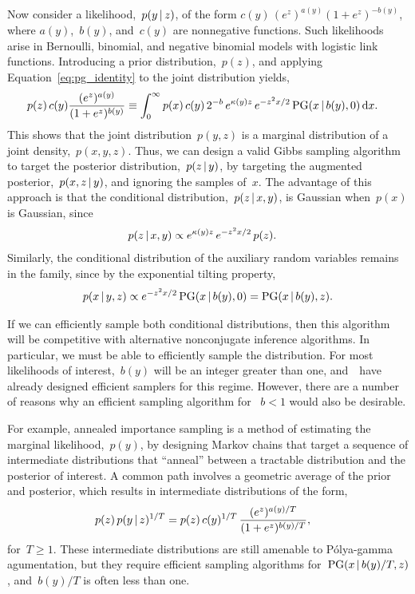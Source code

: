 \documentclass[aos,preprint]{imsart}
\renewcommand{\cite}[1]{\citep{#1}}
\begin{document}
Now consider a likelihood,~$p(y \,|\, z)$, of the form
$c(y)\, (e^{z})^{a(y)} (1+e^z)^{-b(y)}$, where $a(y)$,~$b(y)$,
and~$c(y)$ are nonnegative functions.  Such likelihoods arise in
Bernoulli, binomial, and negative binomial models with logistic link
functions. Introducing a prior distribution,~$p(z)$, and applying
Equation~\ref{eq:pg_identity} to the joint distribution yields,
\begin{align}
p(z) \, c(y) \frac{(e^z)^{a(y)}}{(1+e^z)^{b(y)}} &\equiv 
\int_0^\infty  p(x) \, c(y) \, 2^{-b} \, e^{\kappa(y) z} \,
 e^{-z^2 x/2} \, \distPolyaGamma(x \given b(y), 0) \, \mathrm{d}x .
\end{align}
This shows that the joint distribution~$p(y,z)$ is a marginal
distribution of a joint density,~$p(x,y,z)$. Thus, we can design a
valid Gibbs sampling algorithm to target the posterior
distribution,~$p(z \,|\, y)$, by targeting the augmented
posterior,~$p(x,z \,|\, y)$, and ignoring the samples of~$x$. The
advantage of this approach is that the conditional
distribution,~$p(z \,|\, x, y)$, is Gaussian when~$p(x)$ is
Gaussian, since
\begin{align}
p(z \given x, y) &\propto e^{\kappa(y) z} \, e^{-z^2 x/2} \, p(z).
\end{align}
Similarly, the conditional distribution of the auxiliary
random variables remains in the \polyagamma family,
since by the exponential tilting property,
\begin{align}
p(x \given y, z) \propto e^{-z^2x/2} \,\distPolyaGamma(x \given b(y), 0) 
= \distPolyaGamma(x \given b(y), z).
\end{align}

If we can efficiently sample both conditional distributions, then 
this algorithm will be competitive with alternative nonconjugate inference 
algorithms. 
In particular, we must be able to efficiently sample the \polyagamma distribution. 
For most likelihoods
of interest,~$b(y)$ will be an integer greater than
one, and~\citet{windle2014sampling}~have already designed efficient
samplers for this regime. However, there are a number of reasons why
an efficient sampling algorithm for ~$b<1$ would also be desirable.

For example, annealed importance sampling \cite{neal2001annealed} is a
method of estimating the marginal likelihood,~$p(y)$, by designing
Markov chains that target a sequence of intermediate distributions
that ``anneal'' between a tractable distribution and the posterior of
interest. A common path involves a geometric average of the prior and
posterior, which results in intermediate distributions of the form,
\begin{align}
p(z) \, p(y \given z)^{1/T} &= 
p(z) \, c(y)^{1/T} \, \frac{(e^{z})^{a(y)/T}}{(1+e^z)^{b(y)/T}},
\end{align}
for~$T \geq 1$. These intermediate distributions are still amenable to
P\'{o}lya-gamma agumentation, but they require efficient sampling
algorithms for~$\mathrm{PG}(x \,|\, b(y)/T, z)$, and~$b(y)/T$ is
often less than one.
 
\end{document}

